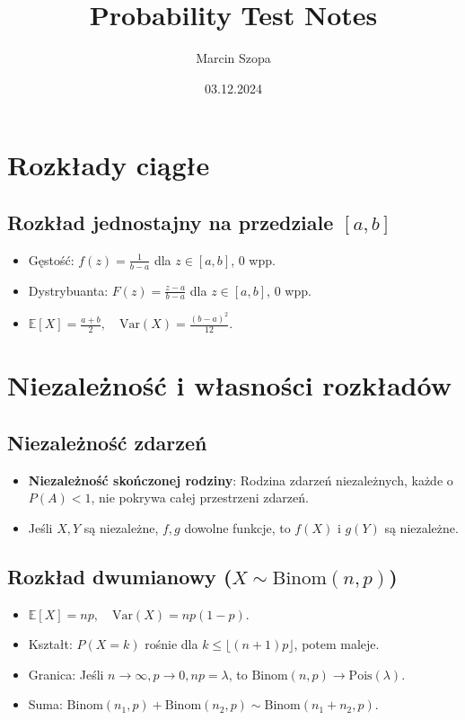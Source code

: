 \documentclass{article}
\title{Probability Test Notes}
\author{Marcin Szopa}
\date{03.12.2024}
\theoremstyle{definition}
\theoremstyle{remark}
\begin{document}
\begin{multicols}{2}
    \section*{Rozkłady ciągłe}
    \subsection*{Rozkład jednostajny na przedziale \( [a, b] \)}
    \begin{itemize}[itemsep=0pt, left=0pt]
        \item Gęstość: \( f(z) = \frac{1}{b-a} \) dla \( z \in [a, b] \), 0 wpp.
        \item Dystrybuanta: \( F(z) = \frac{z-a}{b-a} \) dla \( z \in [a, b] \), 0 wpp.
        \item \(\mathbb{E}[X] = \frac{a+b}{2}, \quad \text{Var}(X) = \frac{(b-a)^2}{12}\).
    \end{itemize}

    \section*{Niezależność i własności rozkładów}

    \subsection*{Niezależność zdarzeń}
    \begin{itemize}[itemsep=0pt, left=0pt]
        \item \textbf{Niezależność skończonej rodziny}: Rodzina zdarzeń niezależnych, każde o \( P(A) < 1 \), nie pokrywa całej przestrzeni zdarzeń.
        \item Jeśli \( X, Y \) są niezależne, \( f, g \) dowolne funkcje, to \( f(X) \) i \( g(Y) \) są niezależne.
    \end{itemize}
    
    \subsection*{Rozkład dwumianowy (\( X \sim \text{Binom}(n, p) \))}
    \begin{itemize}[itemsep=0pt, left=0pt]
        \item \(\mathbb{E}[X] = n p, \quad \text{Var}(X) = n p (1-p)\).
        \item Kształt: \( P(X=k) \) rośnie dla \( k \leq \lfloor (n+1)p \rfloor \), potem maleje.
        \item Granica: Jeśli \( n \to \infty, p \to 0, np = \lambda \), to \( \text{Binom}(n, p) \to \text{Pois}(\lambda) \).
        \item Suma: \( \text{Binom}(n_1, p) + \text{Binom}(n_2, p) \sim \text{Binom}(n_1+n_2, p) \).
    \end{itemize}
    

\end{multicols}
\end{document}
